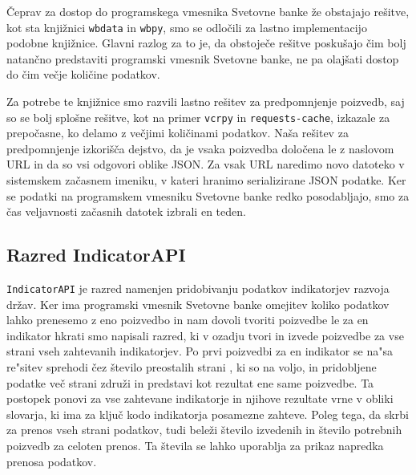Čeprav za dostop do programskega vmesnika Svetovne banke že obstajajo 
rešitve, kot sta knjižnici 
\verb|wbdata| in
\verb|wbpy|, smo se odločili
za lastno implementacijo podobne knjižnice. Glavni razlog za to je, da
obstoječe rešitve poskušajo čim bolj natančno predstaviti programski
vmesnik Svetovne banke, ne pa olajšati dostop do čim večje količine
podatkov.

Za potrebe te knjižnice smo razvili lastno rešitev za predpomnjenje poizvedb,
saj so se bolj splošne rešitve, kot na primer
\verb|vcrpy| in
\verb|requests-cache|,
izkazale za prepočasne, ko delamo z večjimi količinami podatkov. Naša
rešitev za predpomnjenje izkorišča dejstvo, da je vsaka poizvedba določena le
z naslovom URL in da so vsi odgovori oblike JSON. Za vsak URL naredimo novo
datoteko v sistemskem začasnem imeniku, v kateri hranimo serializirane JSON
podatke. Ker se podatki na programskem vmesniku Svetovne banke redko
posodabljajo, smo za čas veljavnosti začasnih datotek izbrali en teden.



\subsection{Razred IndicatorAPI}
\label{razered_indicator_api}

\verb|IndicatorAPI| je razred namenjen pridobivanju podatkov indikatorjev
razvoja držav. Ker ima programski vmesnik Svetovne banke omejitev koliko 
podatkov lahko prenesemo z eno poizvedbo in nam dovoli tvoriti poizvedbe le za
en indikator hkrati smo napisali razred, ki v ozadju tvori in izvede
poizvedbe za vse strani vseh zahtevanih indikatorjev. Po
prvi poizvedbi za en indikator se na"sa re"sitev sprehodi čez število preostalih strani 
, ki so na voljo, in pridobljene podatke več
strani združi in predstavi kot rezultat ene same poizvedbe. Ta postopek ponovi
za vse zahtevane indikatorje in njihove rezultate vrne v obliki slovarja, ki 
ima za ključ kodo indikatorja posamezne zahteve.
Poleg tega, da skrbi za prenos vseh strani podatkov, tudi beleži število 
izvedenih in število potrebnih poizvedb za celoten prenos. Ta števila se
lahko uporablja za prikaz napredka prenosa podatkov.


